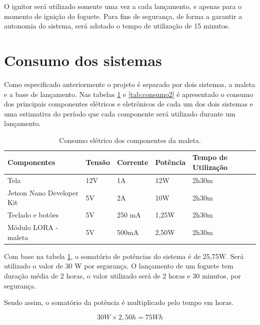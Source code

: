 \par O ignitor será utilizado somente uma vez a cada lançamento, e apenas para o momento de ignição do foguete. Para fins de segurança, de forma a garantir a autonomia do sistema, será adotado o tempo de utilização de 15 minutos.

\section{Consumo dos sistemas}

\par Como especificado anteriormente o projeto é separado por dois sistemas, a maleta e a base de lançamento. Nas tabelas \ref{tab:consumo1} e \ref{tab:consumo2} é apresentado o consumo dos principais componentes elétricos e eletrônicos de cada um dos dois sistemas e uma estimativa do período que cada componente será utilizado durante um lançamento. 

\begin{center}
\begin{table}[H]
\centering
\begin{tabular}{ |m{4cm}|m{2cm}|m{2cm}|m{2cm}|m{3cm}|} 
\hline
\textbf{Componentes}&\textbf{Tensão} & \textbf{Corrente}& \textbf{Potência} & \textbf{Tempo de Utilização}\\ 
 \hline
 Tela & 12V & 1A & 12W & 2h30m\\
  \hline
Jetson Nano Developer Kit & 5V & 2A & 10W & 2h30m\\
  \hline
 Teclado e botões & 5V & 250 mA & 1,25W & 2h30m\\ 
  \hline
 Módulo LORA - maleta & 5V & 500mA & 2,50W &2h30m\\ 
 \hline
 
 \hline
\end{tabular}
\caption{Consumo elétrico dos componentes da maleta.}
\label{tab:consumo1}
\end{table}
\end{center}

\par Com base na tabela \ref{tab:consumo1}, o somatório de potências do sistema é de 25,75W. Será utilizado o valor de 30 W por segurança. O lançamento de um foguete tem duração média de 2 horas, o valor utilizado será de 2 horas e 30 minutos, por segurança.

\par Sendo assim, o somatório da potência é multiplicado pelo tempo em horas.

\begin{equation}
    30W \times 2,50h = 75 Wh
\end{equation}

